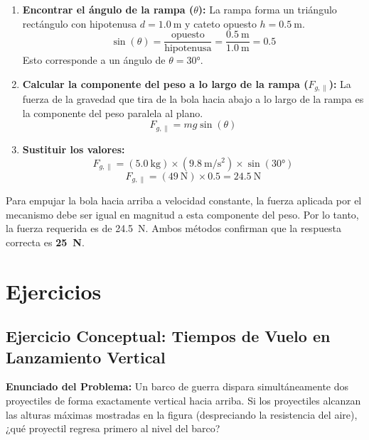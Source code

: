 \documentclass[11pt,a4paper]{book}
\begin{document}
\begin{enumerate}
    \item \textbf{Encontrar el ángulo de la rampa ($\theta$):}
    La rampa forma un triángulo rectángulo con hipotenusa $d=\SI{1.0}{\meter}$ y cateto opuesto $h=\SI{0.5}{\meter}$.
    \[ \sin(\theta) = \frac{\text{opuesto}}{\text{hipotenusa}} = \frac{\SI{0.5}{\meter}}{\SI{1.0}{\meter}} = 0.5 \]
    Esto corresponde a un ángulo de $\theta = \ang{30}$.

    \item \textbf{Calcular la componente del peso a lo largo de la rampa ($F_{g, \parallel}$):}
    La fuerza de la gravedad que tira de la bola hacia abajo a lo largo de la rampa es la componente del peso paralela al plano.
    \[ F_{g, \parallel} = mg \sin(\theta) \]
    
    \item \textbf{Sustituir los valores:}
    \[ F_{g, \parallel} = (\SI{5.0}{\kilo\gram}) \times (\SI{9.8}{\meter\per\second\squared}) \times \sin(\ang{30}) \]
    \[ F_{g, \parallel} = (\SI{49}{\newton}) \times 0.5 = \SI{24.5}{\newton} \]
\end{enumerate}
Para empujar la bola hacia arriba a velocidad constante, la fuerza aplicada por el mecanismo debe ser igual en magnitud a esta componente del peso. Por lo tanto, la fuerza requerida es de \SI{24.5}{\newton}. Ambos métodos confirman que la respuesta correcta es \textbf{\SI{25}{\newton}}.

\section{Ejercicios}

\subsection{Ejercicio Conceptual: Tiempos de Vuelo en Lanzamiento Vertical}

\textbf{Enunciado del Problema:} Un barco de guerra dispara simultáneamente dos proyectiles de forma exactamente vertical hacia arriba. Si los proyectiles alcanzan las alturas máximas mostradas en la figura (despreciando la resistencia del aire), ¿qué proyectil regresa primero al nivel del barco?
\end{document}
